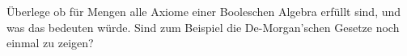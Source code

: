 \begin{exercise}
  Überlege ob für Mengen alle Axiome einer Booleschen Algebra erfüllt
  sind, und was das bedeuten würde. Sind zum Beispiel die De-Morgan'schen
  Gesetze noch einmal zu zeigen?
\end{exercise}
